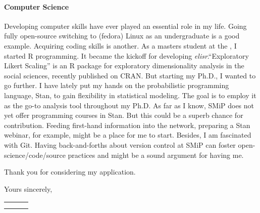 \documentclass[11pt]{FreemanML}
\begin{document}
\paragraph{Computer Science}

Developing computer skills have ever played an essential role in my life. Going
fully open-source switching to (fedora) Linux as an undergraduate is a good
example. Acquiring coding skills is another. As a masters student at the
, I started R programming. It
became the kickoff for developing \textit{elisr}.\enquote{Exploratory Likert
Scaling} is an R package for exploratory dimensionality analysis in the social
sciences, recently published on CRAN. But starting my Ph.D., I wanted to go
further. I have lately put my hands on the probabilistic programming language,
Stan, to gain flexibility in statistical modeling. The goal is to employ it  as
the go-to analysis tool throughout my Ph.D. As far as I know, SMiP does not yet
offer programming courses in Stan. But this could be a superb chance for
contribution. Feeding first-hand information into the network, preparing a
Stan webinar, for example, might be a place for me to start. Besides, I am
fascinated with Git. Having back-and-forths about version control at SMiP can
foster open-science/code/source practices and might be a sound argument for
having me.

\medskip

Thank you for considering my application.

\medskip

Yours sincerely,

\bigskip
\bigskip


\begin{tabular}{p{8cm}p{.5cm}l}
\dotfill \\ 
\centering{Steven Marcel Bißantz} 
\end{tabular}%
\vfill

\end{document}
